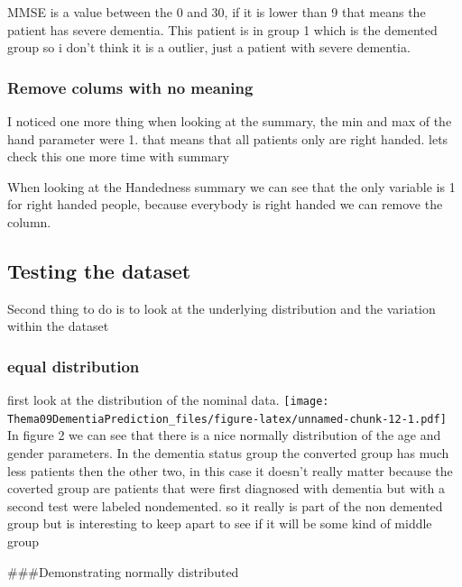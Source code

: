 \documentclass[
]{article}
\begin{document}
MMSE is a value between the 0 and 30, if it is lower than 9 that means
the patient has severe dementia. This patient is in group 1 which is the
demented group so i don't think it is a outlier, just a patient with
severe dementia.

\hypertarget{remove-colums-with-no-meaning}{%
\subsubsection{Remove colums with no
meaning}\label{remove-colums-with-no-meaning}}

I noticed one more thing when looking at the summary, the min and max of
the hand parameter were 1. that means that all patients only are right
handed. lets check this one more time with summary

When looking at the Handedness summary we can see that the only variable
is 1 for right handed people, because everybody is right handed we can
remove the column.

\hypertarget{testing-the-dataset}{%
\subsection{Testing the dataset}\label{testing-the-dataset}}

Second thing to do is to look at the underlying distribution and the
variation within the dataset

\hypertarget{equal-distribution}{%
\subsubsection{equal distribution}\label{equal-distribution}}

first look at the distribution of the nominal data.
\texttt{[image: Thema09DementiaPrediction\_files/figure-latex/unnamed-chunk-12-1.pdf]}
In figure 2 we can see that there is a nice normally distribution of the
age and gender parameters. In the dementia status group the converted
group has much less patients then the other two, in this case it doesn't
really matter because the coverted group are patients that were first
diagnosed with dementia but with a second test were labeled nondemented.
so it really is part of the non demented group but is interesting to
keep apart to see if it will be some kind of middle group

\#\#\#Demonstrating normally distributed
\end{document}
